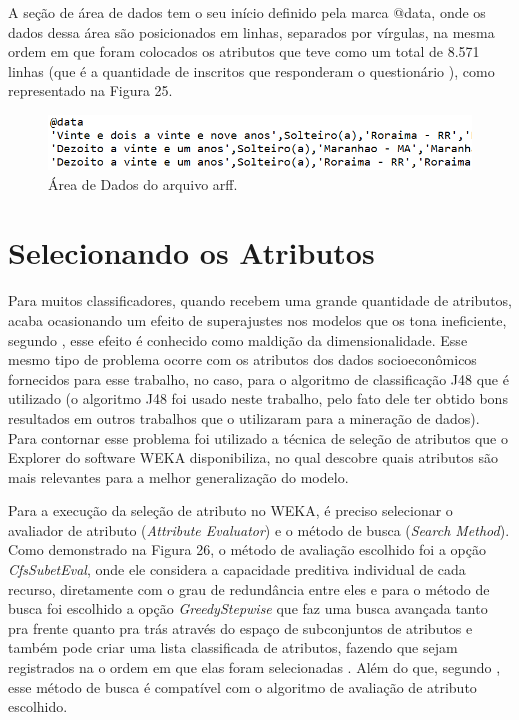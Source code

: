 \par
A seção de área de dados tem o seu início definido pela marca @data, onde os dados dessa área são posicionados em linhas, separados por vírgulas, na mesma ordem em que foram colocados os atributos que teve como um total de 8.571 linhas (que é a quantidade de inscritos que responderam o questionário ), como representado na Figura 25.

\par
\begin{figure}[!htp]
	\begin{center}
    \caption{\label{fig:waveform_fig} Área de Dados do arquivo arff.}
	\includegraphics[scale=0.60]{Figuras/arquivo_arff_2.png}
	\end{center}
\end{figure}

\par
\textcolor{red}{}

\par
\textcolor{red}{}

\section{Selecionando os Atributos}

\par
Para muitos classificadores, quando recebem uma grande quantidade de atributos, acaba ocasionando um efeito de superajustes nos modelos que os tona ineficiente, segundo , esse efeito é conhecido como maldição da dimensionalidade. Esse mesmo tipo de problema ocorre com os atributos dos dados socioeconômicos fornecidos para esse trabalho, no caso, para o algoritmo de classificação J48 que é utilizado (o algoritmo J48 foi usado neste trabalho, pelo fato dele ter obtido bons resultados em outros trabalhos que o utilizaram para a mineração de dados). Para contornar esse problema foi utilizado a técnica de seleção de atributos que o Explorer do software WEKA disponibiliza, no qual descobre quais atributos são mais relevantes para a melhor generalização do modelo.

\par
Para a execução da seleção de atributo no WEKA, é preciso selecionar o avaliador de atributo (\textit{Attribute Evaluator}) e o método de busca (\textit{Search Method}). Como demonstrado na Figura 26, o método de avaliação escolhido foi a opção \textit{CfsSubetEval}, onde ele considera a capacidade preditiva individual de cada recurso, diretamente com o grau de redundância entre eles e para o método de busca foi escolhido a opção \textit{GreedyStepwise} que faz uma busca avançada tanto pra frente quanto pra trás através do espaço de subconjuntos de atributos e também pode criar uma lista classificada de atributos, fazendo que sejam registrados na o ordem em que elas foram selecionadas \cite{WEKA}. Além do que, segundo , esse método de busca é compatível com o algoritmo de avaliação de atributo escolhido. 

